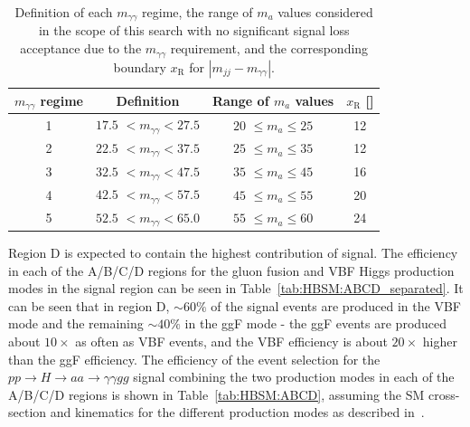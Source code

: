 \begin{table}[t]
  \begin{center}
    \caption{
      Definition of each $m_{\gamma\gamma}$ regime, the range of $m_a$ values considered in the scope of this search with no significant signal loss acceptance due to the $m_{\gamma\gamma}$ requirement, and the corresponding boundary $x_\text{R}$ for $|m_{jj}-m_{\gamma\gamma}|$.  
    }
  \label{tab:HBSM:amassdiffcut}
    {\footnotesize
  \begin{tabular}{ c c c c }
    \toprule
    $m_{\gamma\gamma}$ regime & Definition & Range of $m_a$ values & $x_\text{R}$ [\GeV{}] \\
    \midrule
    1 & $17.5$ \GeV{} $< m_{\gamma\gamma}< 27.5$ \GeV{} & $20$ \GeV{} $\le m_a \le 25$ \GeV{} & 12 \\
      2 & $22.5$ \GeV{} $< m_{\gamma\gamma}< 37.5$ \GeV{} & $25$ \GeV{} $\le m_a \le 35$ \GeV{} & 12 \\
      3 & $32.5$ \GeV{} $< m_{\gamma\gamma}< 47.5$ \GeV{} & $35$ \GeV{} $\le m_a \le 45$ \GeV{} & 16 \\
      4 & $42.5$ \GeV{} $< m_{\gamma\gamma}< 57.5$ \GeV{} & $45$ \GeV{} $\le m_a \le 55$ \GeV{} & 20 \\
      5 & $52.5$ \GeV{} $< m_{\gamma\gamma}< 65.0$ \GeV{} & $55$ \GeV{} $\le m_a \le 60$ \GeV{} & 24 \\
    \bottomrule
  \end{tabular}
    }
  \end{center}
\end{table}

Region D is expected to contain the highest contribution of signal. 
The efficiency in each of the A/B/C/D regions for the gluon fusion and VBF Higgs production modes in the signal region can be seen in Table~\ref{tab:HBSM:ABCD_separated}.
It can be seen that in region D, $\sim60\%$ of the signal events are produced in the VBF mode and the remaining $\sim40\%$ in the ggF mode - the ggF events are produced about $10\times$ as often as VBF events, and the VBF efficiency is about $20\times$ higher than the ggF efficiency.
The efficiency of the event selection for the $pp\to H\to aa \to \gamma\gamma gg$ signal combining the two production modes in each of the A/B/C/D regions is shown in Table~\ref{tab:HBSM:ABCD},
assuming the SM cross-section and kinematics for the different production modes as described in~\cite{deFlorian:2016spz}.

